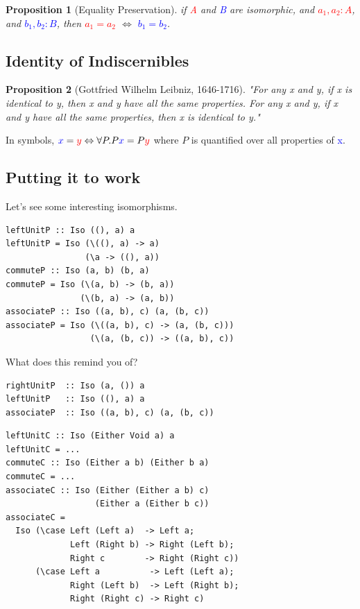 \documentclass[tikz]{beamer}
\newcommand{\red}[1]{\textcolor{red}{#1}}
\newcommand{\mred}[1]{\textcolor{red}{$#1$}}
\newcommand{\blue}[1]{\textcolor{blue}{#1}}
\newcommand{\mblue}[1]{\textcolor{blue}{$#1$}}
\newcommand{\propnumber}{} %
\newtheorem*{prop}{Proposition \propnumber}
\theoremstyle{definition}
\begin{document}
\frame
{ 
	\begin{prop}[Equality Preservation]
		if \red{A} and \blue{B} are isomorphic, and \mred{a_1, a_2 : A}, and \mblue{b_1, b_2 : B}, then \mred{a_1 = a_2} $\Leftrightarrow$ \mblue{b_1 = b_2}.
	\end{prop}
}

\subsection{Identity of Indiscernibles}
\frame
{

	\begin{prop}[Gottfried Wilhelm Leibniz, 1646-1716]
		"For any x and y, if x is identical to y, then x and y have all the same properties. For any x and y, if x and y have all the same properties, then x is identical to y."
	\end{prop}
	
}

\frame
{

	In symbols, $\blue{x} = \red{y} \Leftrightarrow \forall P. P \blue{x} = P \red{y}$ where $P$ is quantified over all properties of \blue{x}.
		
}

\subsection{Putting it to work}
\begin{frame}[fragile]
Let's see some interesting isomorphisms.

\begin{verbatim}
leftUnitP :: Iso ((), a) a
leftUnitP = Iso (\((), a) -> a)
                (\a -> ((), a))
commuteP :: Iso (a, b) (b, a)
commuteP = Iso (\(a, b) -> (b, a))
               (\(b, a) -> (a, b))
associateP :: Iso ((a, b), c) (a, (b, c))
associateP = Iso (\((a, b), c) -> (a, (b, c)))
                 (\(a, (b, c)) -> ((a, b), c))
\end{verbatim}
\end{frame}
\begin{frame}[fragile]
What does this remind you of?
\begin{verbatim}
rightUnitP  :: Iso (a, ()) a
leftUnitP   :: Iso ((), a) a
associateP  :: Iso ((a, b), c) (a, (b, c))
\end{verbatim}
\end{frame}
\begin{frame}[fragile]
\begin{verbatim}
leftUnitC :: Iso (Either Void a) a
leftUnitC = ...
commuteC :: Iso (Either a b) (Either b a)
commuteC = ...
associateC :: Iso (Either (Either a b) c)
                  (Either a (Either b c))
associateC =
  Iso (\case Left (Left a)  -> Left a;
             Left (Right b) -> Right (Left b);
             Right c        -> Right (Right c))
      (\case Left a          -> Left (Left a);
             Right (Left b)  -> Left (Right b);
             Right (Right c) -> Right c)
\end{verbatim}
\end{frame}
\end{document}
